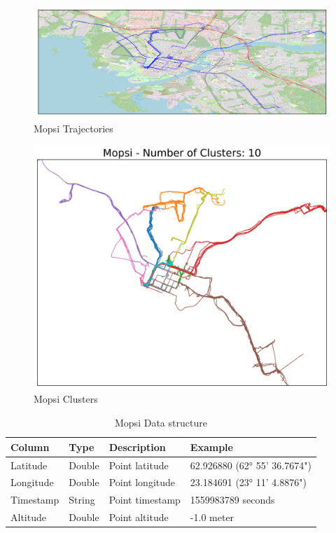 \documentclass[a4paper, 12pt]{article}
\begin{document}
\begin{figure}[bp!]
    \centering
    \includegraphics[width=1\textwidth]{Mopsi Trajectories.png}
    \caption{Mopsi Trajectories}
    \label{fig17}
\end{figure}

\begin{figure}[bp!]
    \centering
    \includegraphics[width=1\textwidth]{Mopsi Clusters.png}
    \caption{Mopsi Clusters}
    \label{fig18}
\end{figure}

\begin{table}[ht!]
    \centering
    \def\arraystretch{3}%
    \caption{Mopsi Data structure}
    \begin{tabular}{||l l l l||} 
     \hline
     \textbf{Column} & \textbf{Type} & \textbf{Description} & \textbf{Example} \\ [0.5ex] 
     \hline\hline
     Latitude & Double & Point latitude & 62.926880 (62° 55' 36.7674") \\ 
     Longitude & Double & Point longitude & 23.184691 (23° 11' 4.8876") \\
     Timestamp & String & Point timestamp & 1559983789 seconds \\
     Altitude & Double & Point altitude & -1.0 meter \\ [1ex] 
     \hline
    \end{tabular}
    \label{table:3}
\end{table}
\end{document}
